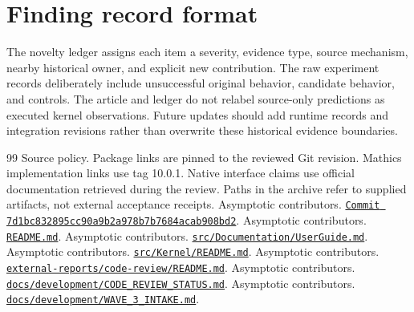 \documentclass[11pt,a4paper]{article}
\begin{document}
\section{Finding record format}

The novelty ledger assigns each item a severity, evidence type, source mechanism,
nearby historical owner, and explicit new contribution. The raw experiment
records deliberately include unsuccessful original behavior, candidate behavior,
and controls. The article and ledger do not relabel source-only predictions as
executed kernel observations. Future updates should add runtime records and
integration revisions rather than overwrite these historical evidence
boundaries.

\begin{thebibliography}{99}
\small
{} Source policy. Package links are pinned to the reviewed Git revision. Mathics implementation links use tag 10.0.1. Native interface claims use official documentation retrieved during the review. Paths in the archive refer to supplied artifacts, not external acceptance receipts.
 Asymptotic contributors. \href{https://github.com/VladimirReshetnikov/Asymptotic/commit/7d1bc832895cc90a9b2a978b7b7684acab908bd2}{\nolinkurl{Commit 7d1bc832895cc90a9b2a978b7b7684acab908bd2}}.
 Asymptotic contributors. \href{https://github.com/VladimirReshetnikov/Asymptotic/blob/7d1bc832895cc90a9b2a978b7b7684acab908bd2/README.md}{\nolinkurl{README.md}}.
 Asymptotic contributors. \href{https://github.com/VladimirReshetnikov/Asymptotic/blob/7d1bc832895cc90a9b2a978b7b7684acab908bd2/src/Documentation/UserGuide.md}{\nolinkurl{src/Documentation/UserGuide.md}}.
 Asymptotic contributors. \href{https://github.com/VladimirReshetnikov/Asymptotic/blob/7d1bc832895cc90a9b2a978b7b7684acab908bd2/src/Kernel/README.md}{\nolinkurl{src/Kernel/README.md}}.
 Asymptotic contributors. \href{https://github.com/VladimirReshetnikov/Asymptotic/blob/7d1bc832895cc90a9b2a978b7b7684acab908bd2/external-reports/code-review/README.md}{\nolinkurl{external-reports/code-review/README.md}}.
 Asymptotic contributors. \href{https://github.com/VladimirReshetnikov/Asymptotic/blob/7d1bc832895cc90a9b2a978b7b7684acab908bd2/docs/development/CODE_REVIEW_STATUS.md}{\nolinkurl{docs/development/CODE_REVIEW_STATUS.md}}.
 Asymptotic contributors. \href{https://github.com/VladimirReshetnikov/Asymptotic/blob/7d1bc832895cc90a9b2a978b7b7684acab908bd2/docs/development/WAVE_3_INTAKE.md}{\nolinkurl{docs/development/WAVE_3_INTAKE.md}}.

\end{thebibliography}
\end{document}
